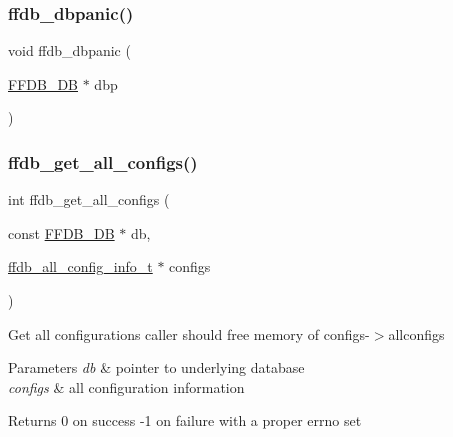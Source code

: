 \mbox{\label{adat-devel_2other__libs_2filedb_2filehash_2ffdb__db_8h_a1ec8fa0dcde4004262934cdb85099527}} 
\subsubsection{\texorpdfstring{ffdb\_dbpanic()}{ffdb\_dbpanic()}}
{\footnotesize\ttfamily void ffdb\+\_\+dbpanic (\begin{DoxyParamCaption}\item[{\mbox{\hyperlink{adat-devel_2other__libs_2filedb_2filehash_2ffdb__db_8h_a0b27b956926453a7a8141ea8e10f0df8}{F\+F\+D\+B\+\_\+\+DB}} $\ast$}]{dbp }\end{DoxyParamCaption})}

\mbox{\label{adat-devel_2other__libs_2filedb_2filehash_2ffdb__db_8h_a4c5be24458701f3a88770dc202be8a0c}} 
\subsubsection{\texorpdfstring{ffdb\_get\_all\_configs()}{ffdb\_get\_all\_configs()}}
{\footnotesize\ttfamily int ffdb\+\_\+get\+\_\+all\+\_\+configs (\begin{DoxyParamCaption}\item[{const \mbox{\hyperlink{adat-devel_2other__libs_2filedb_2filehash_2ffdb__db_8h_a0b27b956926453a7a8141ea8e10f0df8}{F\+F\+D\+B\+\_\+\+DB}} $\ast$}]{db,  }\item[{\mbox{\hyperlink{adat-devel_2other__libs_2filedb_2filehash_2ffdb__db_8h_afc17234e7cd387e11de55b92df6bb0e5}{ffdb\+\_\+all\+\_\+config\+\_\+info\+\_\+t}} $\ast$}]{configs }\end{DoxyParamCaption})}

Get all configurations caller should free memory of configs-\/$>$allconfigs


\begin{DoxyParams}{Parameters}
{\em db} & pointer to underlying database \\
\hline
{\em configs} & all configuration information\\
\hline
\end{DoxyParams}
\begin{DoxyReturn}{Returns}
0 on success -\/1 on failure with a proper errno set 
\end{DoxyReturn}
\mbox{\label{adat-devel_2other__libs_2filedb_2filehash_2ffdb__db_8h_a02bc33564d34e6fe08e28f3bad609cfb}} 
